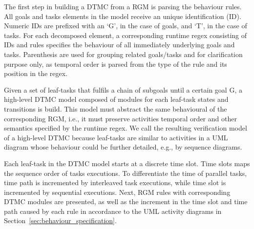 
The first step in building a DTMC from a RGM is parsing the behaviour rules. All goals and tasks elements in the model receive an unique identification (ID). Numeric IDs are prefixed with an `G', in the case of goals, and `T', in the case of tasks. For each decomposed element, a corresponding runtime regex consisting of IDs and rules specifies the behaviour of all immediately underlying goals and tasks. Parenthesis are used for grouping related goals/tasks and for clarification purpose only, as temporal order is parsed from the type of the rule and its position in the regex.


Given a set of leaf-tasks that fulfils a chain of subgoals until a certain goal G, a high-level DTMC model composed of modules for each leaf-task states and transitions is build. This model must abstract the same behavioural of the corresponding RGM, i.e., it must preserve activities temporal order and other semantics specified by the runtime regex. We call the resulting verification model of a high-level DTMC because leaf-tasks are similar to activities in a UML diagram whose behaviour could be further detailed, e.g., by sequence diagrams. 


Each leaf-task in the DTMC model starts at a discrete time slot. Time slots maps the sequence order of tasks executions. To differentiate the time of parallel tasks, time path is incremented by interleaved task executions, while time slot is incremented by sequential executions. Next, RGM rules with corresponding DTMC modules are presented, as well as the increment in the time slot and time path caused by each rule in accordance to the UML activity diagrams in Section~\ref{sec:behaviour_specification}.

